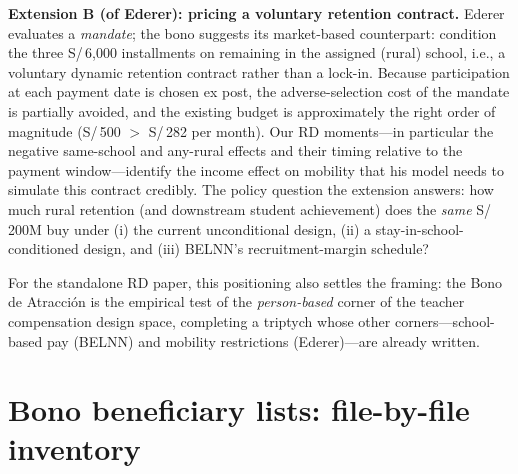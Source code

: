 \documentclass[11pt]{article}
\begin{document}
\textbf{Extension B (of Ederer): pricing a voluntary retention contract.}
Ederer evaluates a \emph{mandate}; the bono suggests its market-based
counterpart: condition the three S/\,6,000 installments on remaining in the
assigned (rural) school, i.e., a voluntary dynamic retention contract rather
than a lock-in. Because participation at each payment date is chosen ex post,
the adverse-selection cost of the mandate is partially avoided, and the
existing budget is approximately the right order of magnitude (S/\,500
$>$ S/\,282 per month). Our RD moments---in particular the negative
same-school and any-rural effects and their timing relative to the payment
window---identify the income effect on mobility that his model needs to
simulate this contract credibly. The policy question the extension answers:
how much rural retention (and downstream student achievement) does the
\emph{same} S/\,200M buy under (i) the current unconditional design, (ii) a
stay-in-school-conditioned design, and (iii) BELNN's recruitment-margin
schedule?

For the standalone RD paper, this positioning also settles the framing: the
Bono de Atracci\'on is the empirical test of the \emph{person-based} corner
of the teacher compensation design space, completing a triptych whose other
corners---school-based pay (BELNN) and mobility restrictions (Ederer)---are
already written.

\appendix

\section{Bono beneficiary lists: file-by-file inventory}\label{app:lists}
\end{document}
